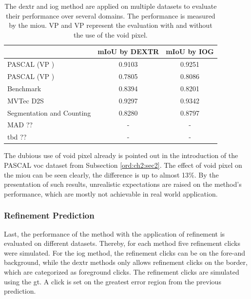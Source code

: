 \begin{table}[h!]
	\centering
	\begin{tabular}{l|c c}
		\toprule 		
										& mIoU by DEXTR & mIoU by IOG	\\
		\midrule
		PASCAL (VP \cmark)				& 0.9103 	& 0.9251	\\
		PASCAL (VP \xmark)				& 0.7805	& 0.8086	\\
		Benchmark 						& 0.8394 	& 0.8201	\\
		MVTec D2S \cite{Paddo18-D2S}	& 0.9297	& 0.9342	\\
		Segmentation and Counting		& 0.8280	& 0.8797 	\\
		MAD	??							& - 		& -		\\
		tbd	??							& -			& - 	\\									
		\bottomrule
	\end{tabular}
	\caption[Generalization of IOG and DEXTR]{
		The \gls{dextr} and \gls{iog} method are applied on multiple datasets to evaluate their performance over several domains.
		The performance is measured by the \gls{miou}.
		VP \cmark and VP \xmark \space represent the evaluation with and without the use of the void pixel.
	}\label{tab:ch5:tests_on_datasets}
\end{table}

The dubious use of void pixel already is pointed out in the introduction of the PASCAL \gls{voc} dataset \cite{Eve20-PascalVOC} from Subsection \ref{ord:ch2:sec2}.
The effect of void pixel on the \gls{miou} can be seen clearly, the difference is up to almost 13\%.
By the presentation of such results, unrealistic expectations are raised on the method's performance, which are mostly not achievable in real world application.

\subsubsection{Refinement Prediction}

Last, the performance of the method with the application of refinement is evaluated on different datasets.
Thereby, for each method five refinement clicks were simulated.
For the \gls{iog} method, the refinement clicks can be on the fore-and background, while the \gls{dextr} methods only allows refinement clicks on the border, which are categorized as foreground clicks.
The refinement clicks are simulated using the \gls{gt}.
A click is set on the greatest error region from the previous prediction.

